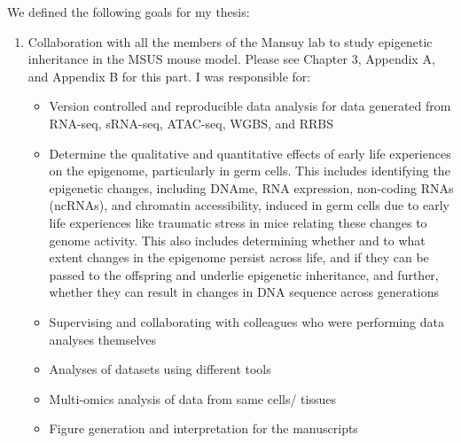 \documentclass[12pt,twoside]{reedthesis}
\begin{document}
We defined the following goals for my thesis:
\begin{enumerate}
\def\labelenumi{\arabic{enumi}.}
\item
  Collaboration with all the members of the Mansuy lab to study
  epigenetic inheritance in the MSUS mouse model. Please see Chapter
  3, Appendix A, and Appendix B for this part. I was responsible for:
  \begin{itemize}
  \item
    Version controlled and reproducible data analysis for data
    generated from RNA-seq, sRNA-seq, ATAC-seq, WGBS, and RRBS
  \item
    Determine the qualitative and quantitative effects of early life
    experiences on the epigenome, particularly in germ cells. This
    includes identifying the epigenetic changes, including DNAme,
    RNA expression, non-coding RNAs (ncRNAs), and chromatin
    accessibility, induced in germ cells due to early life
    experiences like traumatic stress in mice relating these changes
    to genome activity. This also includes determining whether and
    to what extent changes in the epigenome persist across life, and
    if they can be passed to the offspring and underlie epigenetic
    inheritance, and further, whether they can result in changes in
    DNA sequence across generations
  \item
    Supervising and collaborating with colleagues who were
    performing data analyses themselves
  \item
    Analyses of datasets using different tools
  \item
    Multi-omics analysis of data from same cells/ tissues
  \item
    Figure generation and interpretation for the manuscripts
  \end{itemize}
\end{enumerate}
\end{document}
